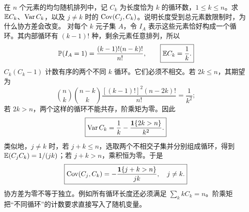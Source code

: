 在 $n$ 个元素的均匀随机排列中，记 $C_k$ 为长度恰为 $k$ 的循环数，$1\le k\le n$。求 $\mathbb{E} C_k$、$\operatorname{Var} C_k$，以及 $j\ne k$ 时的 $\operatorname{Cov}(C_j,C_k)$。说明长度受到总元素数限制时，为什么协方差会改变。
\solution 对每个 $k$ 元子集 $A$，令 $I_A$ 表示这些元素恰好构成一个循环。其内部循环有 $(k-1)!$ 种，剩余元素任意排列，所以
\[
\mathbb{P}(I_A=1)=\frac{(k-1)!(n-k)!}{n!},
\qquad \boxed{\mathbb{E} C_k=\frac1k.}
\]
$C_k(C_k-1)$ 计数有序的两个不同 $k$ 循环。它们必须不相交。若 $2k\le n$，其期望为
\[
\binom nk\binom{n-k}k
\frac{[(k-1)!]^2(n-2k)!}{n!}=\frac1{k^2};
\]
若 $2k>n$，两个这样的循环不能共存，阶乘矩为零。因此
\[
\boxed{\operatorname{Var} C_k=\frac1k-\frac{\mathbf{1}\{2k>n\}}{k^2}.}
\]
类似地，$j\ne k$ 时，若 $j+k\le n$，选取两个不相交子集并分别组成循环，得到 $\mathbb{E}(C_jC_k)=1/(jk)$；若 $j+k>n$，乘积恒为零。于是
\[
\boxed{\operatorname{Cov}(C_j,C_k)=-\frac{\mathbf{1}\{j+k>n\}}{jk},\quad j\ne k.}
\]
\pitfall 协方差为零不等于独立。例如所有循环长度还必须满足 $\sum_k kC_k=n$。阶乘矩把“不同循环”的计数要求直接写入了随机变量。
